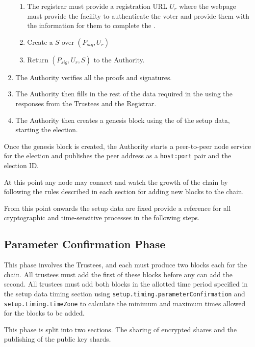 \begin{enumerate}
\begin{enumerate}
              \item The registrar must provide a registration URL $U_r$ where the webpage must provide the facility to authenticate the voter and provide them with the information for them to complete the .
              \item Create a  $S$ over $(P_{sig}, U_r)$
              \item Return $(P_{sig}, U_r, S)$ to the Authority.
          \end{enumerate}
    \item The Authority verifies all the proofs and signatures.
    \item The Authority then fills in the rest of the data required in the  using the responses from the Trustees and the Registrar.
    \item The Authority then creates a genesis block using the  of the setup data, starting the election.
\end{enumerate}

Once the genesis block is created, the Authority starts a peer-to-peer node service for the election and publishes the peer address as a \texttt{host:port} pair and the election ID.

At this point any node may connect and watch the growth of the chain by following the rules described in each section for adding new blocks to the chain.

From this point onwards the setup data are fixed provide a reference for all cryptographic and time-sensitive processes in the following steps.

\subsection{Parameter Confirmation Phase}
\label{ch:astris:detail:params}

This phase involves the Trustees, and each must produce two blocks each for the chain. All trustees must add the first of these blocks before any can add the second. All trustees must add both blocks in the allotted time period specified in the setup data timing section using \texttt{setup.timing.parameterConfirmation} and \texttt{setup.timing.timeZone} to calculate the minimum and maximum times allowed for the blocks to be added.

This phase is split into two sections. The sharing of encrypted shares and the publishing of the public key shards.

